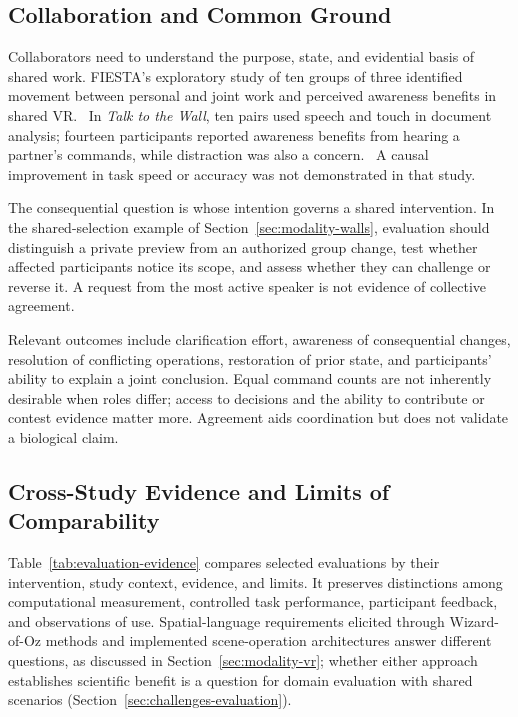 \subsection{Collaboration and Common Ground}
\label{sec:evaluation-collaboration}
Collaborators need to understand the purpose, state, and evidential basis of shared work. FIESTA's exploratory study of ten groups of three identified movement between personal and joint work and perceived awareness benefits in shared VR.~\cite{EvalLee2021} In \emph{Talk to the Wall}, ten pairs used speech and touch in document analysis; fourteen participants reported awareness benefits from hearing a partner's commands, while distraction was also a concern.~\cite{EvalMolinaLeon2025} A causal improvement in task speed or accuracy was not demonstrated in that study.

The consequential question is whose intention governs a shared intervention. In the shared-selection example of Section~\ref{sec:modality-walls}, evaluation should distinguish a private preview from an authorized group change, test whether affected participants notice its scope, and assess whether they can challenge or reverse it. A request from the most active speaker is not evidence of collective agreement.

Relevant outcomes include clarification effort, awareness of consequential changes, resolution of conflicting operations, restoration of prior state, and participants' ability to explain a joint conclusion. Equal command counts are not inherently desirable when roles differ; access to decisions and the ability to contribute or contest evidence matter more. Agreement aids coordination but does not validate a biological claim.

\subsection{Cross-Study Evidence and Limits of Comparability}
\label{sec:evaluation-comparison}
Table~\ref{tab:evaluation-evidence} compares selected evaluations by their intervention, study context, evidence, and limits. It preserves distinctions among computational measurement, controlled task performance, participant feedback, and observations of use. Spatial-language requirements elicited through Wizard-of-Oz methods and implemented scene-operation architectures answer different questions, as discussed in Section~\ref{sec:modality-vr}; whether either approach establishes scientific benefit is a question for domain evaluation with shared scenarios (Section~\ref{sec:challenges-evaluation}).

